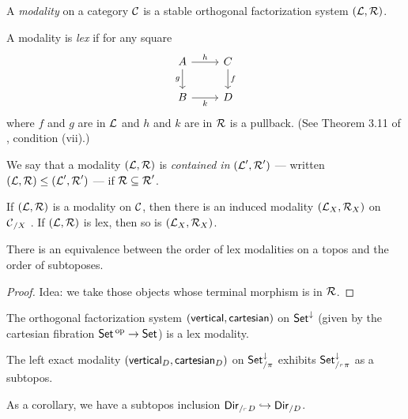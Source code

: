 \begin{defn}
A \emph{modality} on a category $\Ca$ is a stable orthogonal factorization
system $(\La, \Ra)$. 

A modality is \emph{lex} if for any square
\[
\begin{tikzcd}
A \arrow[r, "h"] \arrow[d, "g"'] & C \arrow[d, "f"] \\
B \arrow[r, "k"']                & D               
\end{tikzcd}
\]
where $f$ and $g$ are in $\La$ and $h$ and $k$ are in $\Ra$ is a pullback. (See
Theorem 3.11 of \cite{RSS:Modalties.in.HoTT}, condition (vii).)


We say that a modality $(\La, \Ra)$ is \emph{contained in} $(\La', \Ra')$ ---
written $(\La, \Ra) \leq (\La', \Ra')$ --- if $\Ra \subseteq \Ra'$.
\end{defn}

\begin{prop}
If $(\La, \Ra)$ is a modality on $\Ca$, then there is an induced modality $(\La_X,
\Ra_X)$ on $\Ca_{/X}$ . If $(\La, \Ra)$ is lex, then so is $(\La_X, \Ra_X)$.
\end{prop}

\begin{prop}
There is an equivalence between the order of lex modalities on a topos and the
order of subtoposes.
\end{prop}
\begin{proof}
Idea: we take those objects whose terminal morphism is in $\Ra$.
\end{proof}

\begin{prop}
The orthogonal factorization system $(\term{vertical}, \term{cartesian})$ on
$\Set^{\downarrow}$ (given by the cartesian fibration $\Set\op \to \Set$) is a
lex modality.
\end{prop}

\begin{thm}
The left exact modality $(\term{vertical}_D, \term{cartesian}_D)$ on
$\Set^{\downarrow}_{/\pi}$ exhibits $\Set^{\downarrow}_{/_{\ulcorner} \pi}$ as a
subtopos.

As a corollary, we have a subtopos inclusion $\Dir_{/_{\ulcorner} D}
\hookrightarrow \Dir_{/D}$. 
\end{thm}
  
